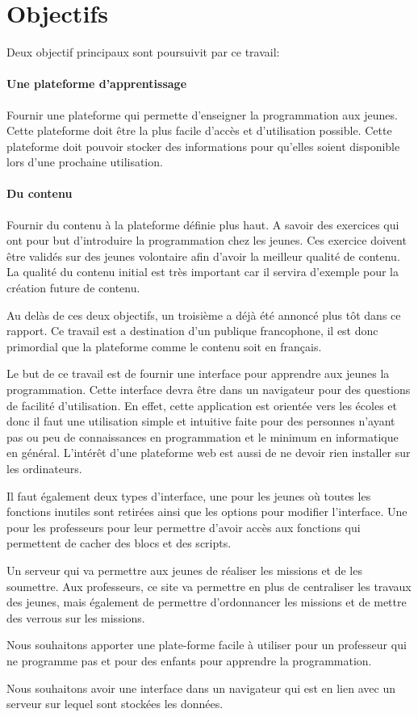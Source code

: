 \section{Objectifs}
\label{intro-objectifs}

Deux objectif principaux sont poursuivit par ce travail:

\paragraph{Une plateforme d'apprentissage} Fournir une plateforme qui permette d'enseigner la programmation aux jeunes. Cette plateforme doit être la plus facile d'accès et d'utilisation possible. Cette plateforme doit pouvoir stocker des informations pour qu'elles soient disponible lors d'une prochaine utilisation.

\paragraph{Du contenu} Fournir du contenu à la plateforme définie plus haut. A savoir des exercices qui ont pour but d'introduire la programmation chez les jeunes. Ces exercice doivent être validés sur des jeunes volontaire afin d'avoir la meilleur qualité de contenu. La qualité du contenu initial est très important car il servira d'exemple pour la création future de contenu.

Au delàs de ces deux objectifs, un troisième a déjà été annoncé plus tôt dans ce rapport. Ce travail est a destination d'un publique francophone, il est donc primordial que la plateforme comme le contenu soit en français.

Le but de ce travail est de fournir une interface pour apprendre aux jeunes la programmation. Cette interface devra être dans un navigateur pour des questions de facilité d'utilisation. En effet, cette application est orientée vers les écoles et donc il faut une utilisation simple et intuitive faite pour des personnes n'ayant pas ou peu de connaissances en programmation et le minimum en informatique en général. L'intérêt d'une plateforme web est aussi de ne devoir rien installer sur les ordinateurs.

Il faut également deux types d'interface, une pour les jeunes où toutes les fonctions inutiles sont retirées ainsi que les options pour modifier l'interface. Une pour les professeurs pour leur permettre d'avoir accès aux fonctions qui permettent de cacher des blocs et des scripts.

Un serveur qui va permettre aux jeunes de réaliser les missions et de les soumettre. Aux professeurs, ce site va permettre en plus de centraliser les travaux des jeunes, mais également de permettre d'ordonnancer les missions et de mettre des verrous sur les missions.

Nous souhaitons apporter une plate-forme facile à utiliser pour un professeur qui ne programme pas et pour des enfants pour apprendre la programmation. 

Nous souhaitons avoir une interface dans un navigateur qui est en lien avec un serveur sur lequel sont stockées les données.

